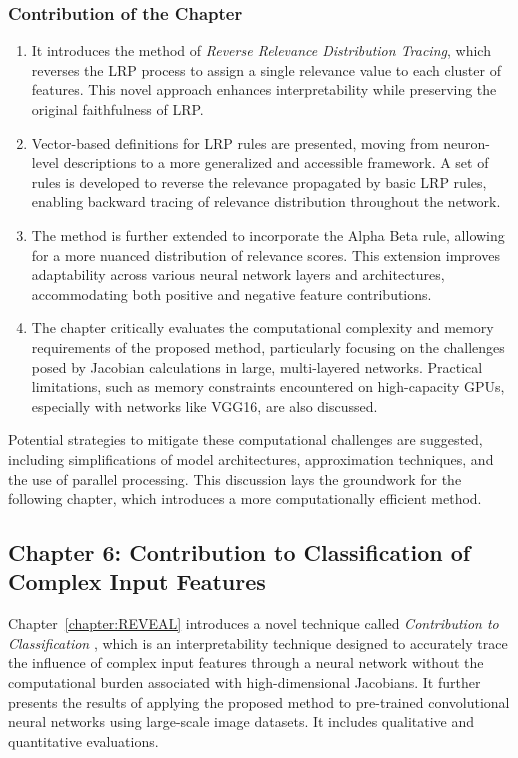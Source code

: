 \subsubsection*{Contribution of the Chapter}

\begin{enumerate} 
    \item It introduces the method of \emph{Reverse Relevance Distribution Tracing}, which reverses the LRP process to assign a single relevance value to each cluster of features. This novel approach enhances interpretability while preserving the original faithfulness of LRP.
    \item Vector-based definitions for LRP rules are presented, moving from neuron-level descriptions to a more generalized and accessible framework. A set of rules is developed to reverse the relevance propagated by basic LRP rules, enabling backward tracing of relevance distribution throughout the network.
    \item The method is further extended to incorporate the Alpha Beta rule, allowing for a more nuanced distribution of relevance scores. This extension improves adaptability across various neural network layers and architectures, accommodating both positive and negative feature contributions.
    \item The chapter critically evaluates the computational complexity and memory requirements of the proposed method, particularly focusing on the challenges posed by Jacobian calculations in large, multi-layered networks. Practical limitations, such as memory constraints encountered on high-capacity GPUs, especially with networks like VGG16, are also discussed.

\end{enumerate}
Potential strategies to mitigate these computational challenges are suggested, including simplifications of model architectures, approximation techniques, and the use of parallel processing. This discussion lays the groundwork for the following chapter, which introduces a more computationally efficient method.

\subsection{Chapter 6: Contribution to Classification of Complex Input Features}
Chapter~\ref{chapter:REVEAL} introduces a novel technique called \emph{Contribution to Classification} \CTC\/, which is an interpretability technique designed to accurately trace the influence of complex input features through a neural network without the computational burden associated with high-dimensional Jacobians. It further presents the results of applying the proposed method to pre-trained convolutional neural networks using large-scale image datasets. It includes qualitative and quantitative evaluations.

